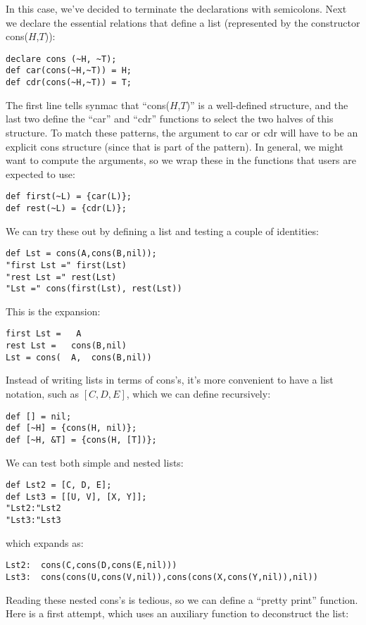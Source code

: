 \documentclass[12pt]{article}
\begin{document}
In this case, we've decided to terminate the declarations with semicolons.
Next we declare the essential relations that define a list
(represented by the constructor cons($H$,$T$)):
\begin{lstlisting}[frame=single,language=func]
declare cons (~H, ~T);
def car(cons(~H,~T)) = H;
def cdr(cons(~H,~T)) = T;
\end{lstlisting}
The first line tells synmac that ``cons($H$,$T$)'' is a well-defined structure, and the last two define the ``car'' and ``cdr'' functions to select the two halves of this structure.
To match these patterns, the argument to car or cdr will have to be an explicit cons structure (since that is part of the pattern).
In general, we might want to compute the arguments, so we wrap these in the functions that users are expected to use:
\begin{lstlisting}[frame=single,language=func]
def first(~L) = {car(L)};
def rest(~L) = {cdr(L)};
\end{lstlisting}
We can try these out by defining a list and testing a couple of identities:
\begin{lstlisting}[frame=single,language=func]
def Lst = cons(A,cons(B,nil));
"first Lst =" first(Lst)
"rest Lst =" rest(Lst)
"Lst =" cons(first(Lst), rest(Lst))
\end{lstlisting}
This is the expansion:
\begin{lstlisting}[frame=single]
first Lst =   A
rest Lst =   cons(B,nil)
Lst = cons(  A,  cons(B,nil))
\end{lstlisting}
Instead of writing lists in terms of cons's, it's more convenient to have a list notation, such as $[C, D, E]$, which we can define recursively:
\begin{lstlisting}[frame=single,language=func]
def [] = nil;
def [~H] = {cons(H, nil)};
def [~H, &T] = {cons(H, [T])};
\end{lstlisting}
We can test both simple and nested lists:
\begin{lstlisting}[frame=single,language=func]
def Lst2 = [C, D, E];
def Lst3 = [[U, V], [X, Y]];
"Lst2:"Lst2
"Lst3:"Lst3
\end{lstlisting}
which expands as:
\begin{lstlisting}[frame=single]
Lst2:  cons(C,cons(D,cons(E,nil)))
Lst3:  cons(cons(U,cons(V,nil)),cons(cons(X,cons(Y,nil)),nil))
\end{lstlisting}
Reading these nested cons's is tedious, so we can define a ``pretty print'' function.
Here is a first attempt, which uses an auxiliary function to deconstruct the list:
\end{document}
